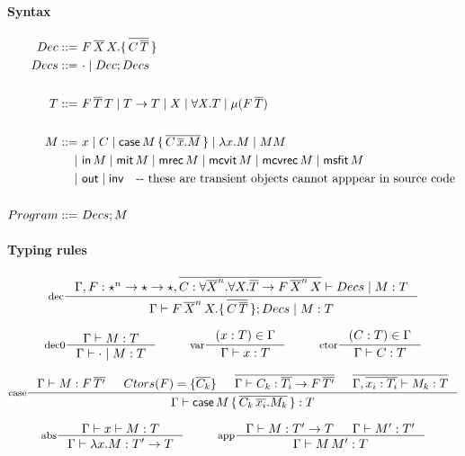 \documentclass[a4paper,12pt]{book}
\newcommand{\case}[0]{\ensuremath{\mathsf{case}}}
\newcommand{\miter}[0]{\ensuremath{\mathsf{mit}}}
\newcommand{\mrec}[0]{\ensuremath{\mathsf{mrec}}}
\newcommand{\mcvit}[0]{\ensuremath{\mathsf{mcvit}}}
\newcommand{\mcvrec}[0]{\ensuremath{\mathsf{mcvrec}}}
\newcommand{\msfit}[0]{\ensuremath{\mathsf{msfit}}}
\newcommand{\In}[0]{\ensuremath{\mathsf{in}}}
\newcommand{\out}[0]{\ensuremath{\mathsf{out}}}
\newcommand{\Inv}[0]{\ensuremath{\mathsf{inv}}}
\begin{document}
\paragraph{Syntax}
\begin{align*}
Dec  ::=&~ F\,\overline{X}\,X.\{\,\overline{C\,\overline{T}}\,\} \\
Decs ::=&~ \cdot \mid Dec;Decs
\\ ~ \\
T ::=&~ F\,\overline{T}\,T
 \mid   T -> T
 \mid   X 
 \mid   \forall X . T
 \mid   \mu(F\,\overline{T})
\\ ~ \\
M ::=&~ x \mid C
 \mid   \case\,M\,\{\,\overline{C\,\overline{x}.M}\,\}
 \mid   \lambda x . M
 \mid   M M
\\
 \mid&~ \In\,M
 \mid   \miter\,M
 \mid   \mrec\,M
 \mid   \mcvit\,M
 \mid   \mcvrec\,M
 \mid   \msfit\,M \\
 \mid&~ \out
 \mid   \Inv ~~~\text{-\,\!- these are transient objects cannot apppear in source code }
\\ ~ \\
Program ::=&~ Decs; M
\end{align*}

\paragraph{Typing rules}
\[ \inference[dec]
      {\Gamma, F:\star^n->\star->\star,
       \overline{C:\forall\overline{X}^n.\forall X.\overline{T}->F\,\overline{X}^n\,X}
       |- Decs \mid M : T}
      {\Gamma
       |- F\,\overline{X}^n\,X.\{\,\overline{C\,\overline{T}}\,\};Decs \mid M : T}
\]

\[ \inference[dec0]{\Gamma |- M : T}{\Gamma |- \cdot \mid M : T}
   ~~~~~~~~
   \inference[var]{(x:T) \in \Gamma}{\Gamma |- x:T}
   ~~~~~~~~
   \inference[ctor]{(C:T) \in \Gamma}{\Gamma |- C:T}
\]

\[ \inference[case]
      { \Gamma |- M : F\,\overline{T'} & Ctors(F) = \{ \overline{C_k} \}
      & \overline{\Gamma |- C_k : \overline{T_i} -> F\,\overline{T'}}
      & \overline{ \Gamma, \overline{x_i:T_i} |- M_k : T }
      }{\Gamma |- \case\,M\,\{\,\overline{C_k\,\overline{x_i}.M_k}\,\} : T}
\]

\[ \inference[abs]{\Gamma |- x |- M : T}
                  {\Gamma |- \lambda x .M : T' -> T}
   ~~~~~~~~
   \inference[app]{\Gamma |- M : T' -> T & \Gamma |- M' : T'}
                  {\Gamma |- M\,M' : T}
\]
\end{document}
